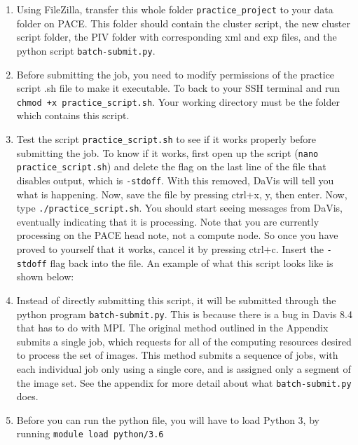 \documentclass{article}
\begin{document}
\begin{enumerate}
    	\item Using FileZilla, transfer this whole folder \texttt{practice\_project} to your data folder on PACE.  This folder should contain the cluster script, the new cluster script folder, the PIV folder with corresponding xml and exp files, and the python script \texttt{batch-submit.py}.
    	\item Before submitting the job, you need to modify permissions of the practice script .sh file to make it executable.  To back to your SSH terminal and run \texttt{chmod +x practice\_script.sh}.  Your working directory must be the folder which contains this script.
    	\item Test the script \texttt{practice\_script.sh} to see if it works properly before submitting the job.  To know if it works, first open up the script (\texttt{nano practice\_script.sh}) and delete the flag on the last line of the file that disables output, which is \texttt{-stdoff}.  With this removed, DaVis will tell you what is happening.  Now, save the file by pressing ctrl+x, y, then enter.  Now, type \texttt{./practice\_script.sh}.  You should start seeing messages from DaVis, eventually indicating that it is processing.  Note that you are currently processing on the PACE head note, not a compute node.  So once you have proved to yourself that it works, cancel it by pressing ctrl+c.  Insert the \texttt{-stdoff} flag back into the file.  An example of what this script looks like is shown below:
    	
    	\newpage
    	
    	\item Instead of directly submitting this script, it will be submitted through the python program \texttt{batch-submit.py}.  This is because there is a bug in Davis 8.4 that has to do with MPI.  The original method outlined in the Appendix submits a single job, which requests for all of the computing resources desired to process the set of images.  This method submits a sequence of jobs, with each individual job only using a single core, and is assigned only a segment of the image set.  See the appendix for more detail about what \texttt{batch-submit.py} does.  
    	
    	\item Before you can run the python file, you will have to load Python 3, by running \texttt{module load python/3.6}
    	

\end{enumerate}
\end{document}
